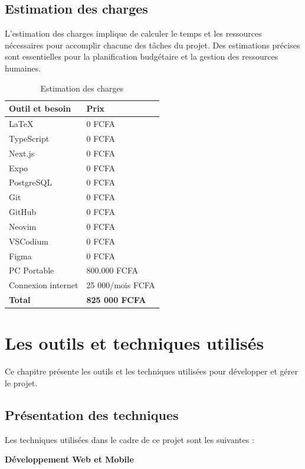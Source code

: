 \section{Estimation des charges}
L’estimation des charges implique de calculer le temps et les ressources
nécessaires pour accomplir chacune des tâches du projet.
Des estimations précises sont essentielles pour la planification budgétaire et
la gestion des ressources humaines.


\begin{table}[htbp]
  \centering
  \begin{tabularx}{\textwidth}{|l|X|}
    \hline
    \textbf{Outil et besoin} & \textbf{Prix} \\ \hline

    \LaTeX & 0 FCFA \\ \hline
    TypeScript & 0 FCFA \\ \hline
    Next.js & 0 FCFA \\ \hline
    Expo & 0 FCFA \\ \hline
    PostgreSQL  & 0 FCFA \\ \hline
    Git &  0 FCFA \\ \hline
    GitHub & 0 FCFA \\ \hline
    Neovim & 0 FCFA \\ \hline
    VSCodium & 0 FCFA \\ \hline
    Figma  & 0 FCFA \\ \hline
    PC Portable & 800.000 FCFA \\ \hline
    Connexion internet & 25 000/mois FCFA \\ \hline
    \textbf{Total} & \textbf{825 000 FCFA} \\ \hline
  \end{tabularx}
  \caption{Estimation des charges}
\end{table}

\chapter{Les outils et techniques utilisés}
Ce chapitre présente les outils et les techniques utilisées pour développer
et gérer le projet.

\section{Présentation des techniques}
Les techniques utilisées dans le cadre de ce projet sont les suivantes :

  \textbf{ {Développement Web et Mobile}}

